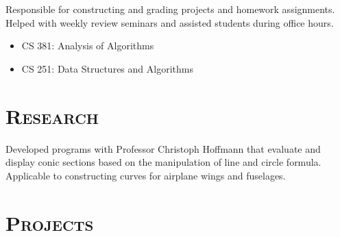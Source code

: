 \begin{resume}
\begin{formatb}
  \\
  \body\\
\end{formatb}

\begin{position}
  Responsible for constructing and grading projects and homework assignments. Helped with weekly review seminars and assisted students during office hours.
\begin{itemize}
\item CS 381: Analysis of Algorithms
\end{itemize}
\begin{itemize}
\item CS 251: Data Structures and Algorithms
\end{itemize}
\end{position}


\section{\textsc{Research}}

\begin{position}
    Developed programs with Professor Christoph Hoffmann that evaluate and display conic sections based on the manipulation of line and circle formula. Applicable to constructing curves for airplane wings and fuselages.
\end{position}

\section{\textsc{Projects}}


\begin{formatb}
  \\
  \body\\
\end{formatb}


\end{resume}
